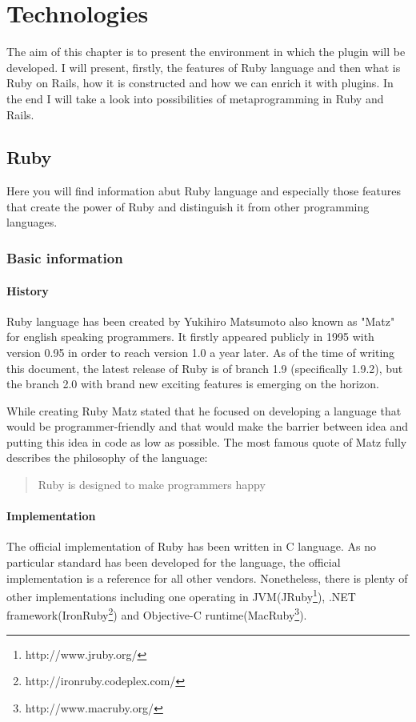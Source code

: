 \nocite{ruby02}
\nocite{ruby03}
\chapter{Technologies}
  The aim of this chapter is to present the environment in which the plugin will be developed. I will present, firstly, the features of Ruby language and then what is Ruby on Rails, how it is constructed and how we can enrich it with plugins. In the end I will take a look into possibilities of metaprogramming in Ruby and Rails.
  
  \section{Ruby}
  Here you will find information abut Ruby language and especially those features that create the power of Ruby and distinguish it from other programming languages.
    \subsection{Basic information}
      \subsubsection{History}
      Ruby language has been created by Yukihiro Matsumoto also known as "Matz" for english speaking programmers. It firstly appeared publicly in 1995 with version 0.95 in order to reach version 1.0 a year later. As of the time of writing this document, the latest release of Ruby is of branch 1.9 (specifically 1.9.2), but the branch 2.0 with brand new exciting features is emerging on the horizon.
    
      While creating Ruby Matz stated that he focused on developing a language that would be programmer-friendly and that would make the barrier between idea and putting this idea in code as low as possible. The most famous quote of Matz fully describes the philosophy of the language:
    
      \begin{quote}
        Ruby is designed to make programmers happy
      \end{quote}
        
      \subsubsection{Implementation}
      The official implementation of Ruby has been written in C language. As no particular standard has been developed for the language, the official implementation is a reference for all other vendors. Nonetheless, there is plenty of other implementations including one operating in JVM(JRuby\footnote{http://www.jruby.org/}), .NET framework(IronRuby\footnote{http://ironruby.codeplex.com/}) and Objective-C runtime(MacRuby\footnote{http://www.macruby.org/}).
    
